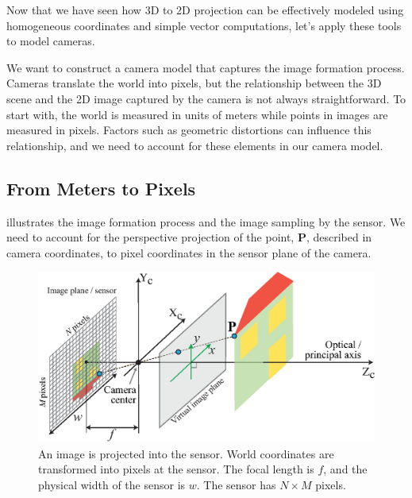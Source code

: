 Now that we have seen how 3D to 2D projection can be effectively modeled using homogeneous coordinates and simple vector computations, let's apply these tools to model cameras.

We want to construct a camera model that captures the image formation process. Cameras translate the world into pixels, but the relationship between the 3D scene and the 2D image captured by the camera is not always straightforward. To start with, the world is measured in units of meters while points in images are measured in pixels. Factors such as geometric distortions can influence this relationship, and we need to account for these elements in our camera model.

\subsection{From Meters to Pixels}

\Fig{\ref{fig:pinhole_and_sensor}} illustrates the image formation process and the image sampling by the sensor. 
We need to account for the perspective projection of the point, $\mathbf{P}$, described in camera coordinates, to pixel coordinates in the sensor plane of the camera.  

\begin{figure}[t]
\centerline{
\includegraphics[width=1\linewidth]{figures/imaging_geometry/pinhole_and_sensor.eps}
}
\caption{An image is projected into the sensor. World coordinates are transformed into pixels at the sensor. The focal length is $f$, and the physical width of the sensor is $w$. The sensor has $N \times M$ pixels.}
\label{fig:pinhole_and_sensor}
\end{figure}



